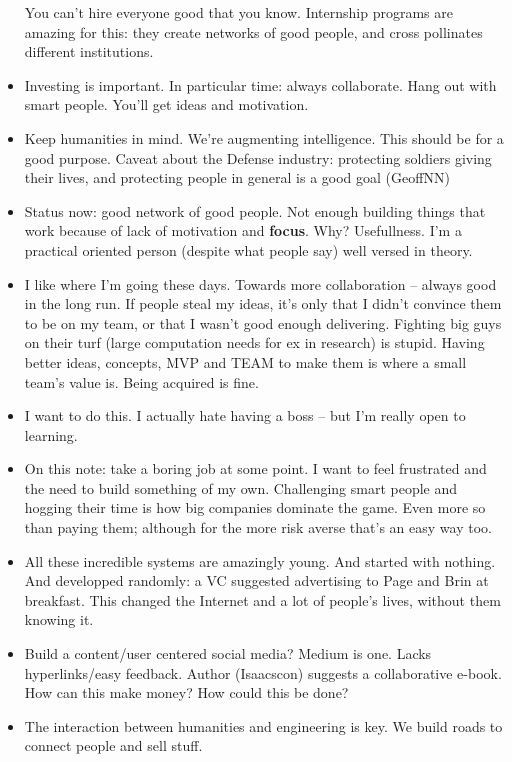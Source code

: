 \begin{itemize}
    You can't hire everyone good that you know.
    Internship programs are amazing for this: they create networks of good people, and cross pollinates different institutions.
    \item Investing is important.
    In particular time: always collaborate.
    Hang out with smart people.
    You'll get ideas and motivation.
    \item Keep humanities in mind. We're augmenting intelligence.
    This should be for a good purpose.
    Caveat about the Defense industry: protecting soldiers giving their lives, and protecting people in general is a good goal (GeoffNN)
    \item Status now: good network of good people.
    Not enough building things that work because of lack of motivation and \textbf{focus}.
    Why? Usefullness.
    I'm a practical oriented person (despite what people say) well versed in theory. 
    \item I like where I'm going these days.
    Towards more collaboration -- always good in the long run.
    If people steal my ideas, it's only that I didn't convince them to be on my team, or that I wasn't good enough delivering.
    Fighting big guys on their turf (large computation needs for ex in research) is stupid.
    Having better ideas, concepts, MVP and TEAM to make them is where a small team's value is.
    Being acquired is fine.
    \item I want to do this.
    I actually hate having a boss -- but I'm really open to learning.
    \item On this note: take a boring job at some point.
    I want to feel frustrated and the need to build something of my own.
    Challenging smart  people and hogging their time is how big companies dominate the game.
    Even more so than paying them; although for the more risk averse that's an easy way too.
    \item All these incredible systems are amazingly young.
    And started with nothing.
    And developped randomly: a VC suggested advertising to Page and Brin at breakfast.
    This changed the Internet and a lot of people's lives, without them knowing it.
    \item Build a content/user centered social media?
    Medium is one.
    Lacks hyperlinks/easy feedback.
    Author (Isaacscon) suggests a collaborative e-book.
    How can this make money? How could this be done? 
    \item The interaction between humanities and engineering is key.
    We build roads to connect people and sell stuff.

\end{itemize}
